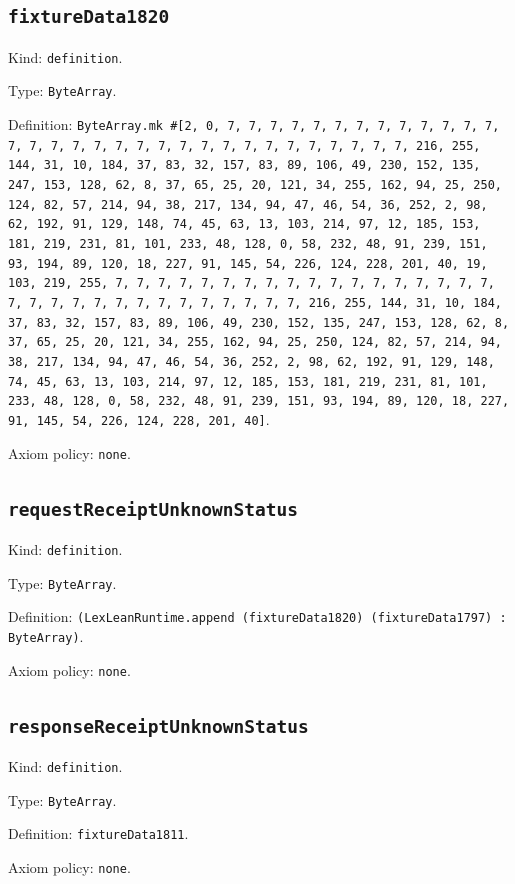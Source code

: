 \documentclass[11pt]{article}
\begin{document}
\subsection*{\texttt{fixtureData1820}}
\noindent Kind: \texttt{definition}.\par
\noindent Type: \texttt{ByteArray}.\par
\noindent Definition: \texttt{ByteArray.mk \#[2, 0, 7, 7, 7, 7, 7, 7, 7, 7, 7, 7, 7, 7, 7, 7, 7, 7, 7, 7, 7, 7, 7, 7, 7, 7, 7, 7, 7, 7, 7, 7, 7, 7, 216, 255, 144, 31, 10, 184, 37, 83, 32, 157, 83, 89, 106, 49, 230, 152, 135, 247, 153, 128, 62, 8, 37, 65, 25, 20, 121, 34, 255, 162, 94, 25, 250, 124, 82, 57, 214, 94, 38, 217, 134, 94, 47, 46, 54, 36, 252, 2, 98, 62, 192, 91, 129, 148, 74, 45, 63, 13, 103, 214, 97, 12, 185, 153, 181, 219, 231, 81, 101, 233, 48, 128, 0, 58, 232, 48, 91, 239, 151, 93, 194, 89, 120, 18, 227, 91, 145, 54, 226, 124, 228, 201, 40, 19, 103, 219, 255, 7, 7, 7, 7, 7, 7, 7, 7, 7, 7, 7, 7, 7, 7, 7, 7, 7, 7, 7, 7, 7, 7, 7, 7, 7, 7, 7, 7, 7, 7, 7, 7, 216, 255, 144, 31, 10, 184, 37, 83, 32, 157, 83, 89, 106, 49, 230, 152, 135, 247, 153, 128, 62, 8, 37, 65, 25, 20, 121, 34, 255, 162, 94, 25, 250, 124, 82, 57, 214, 94, 38, 217, 134, 94, 47, 46, 54, 36, 252, 2, 98, 62, 192, 91, 129, 148, 74, 45, 63, 13, 103, 214, 97, 12, 185, 153, 181, 219, 231, 81, 101, 233, 48, 128, 0, 58, 232, 48, 91, 239, 151, 93, 194, 89, 120, 18, 227, 91, 145, 54, 226, 124, 228, 201, 40]}.\par
\noindent Axiom policy: \texttt{none}.\par
\subsection*{\texttt{requestReceiptUnknownStatus}}
\noindent Kind: \texttt{definition}.\par
\noindent Type: \texttt{ByteArray}.\par
\noindent Definition: \texttt{(LexLeanRuntime.append (fixtureData1820) (fixtureData1797) : ByteArray)}.\par
\noindent Axiom policy: \texttt{none}.\par
\subsection*{\texttt{responseReceiptUnknownStatus}}
\noindent Kind: \texttt{definition}.\par
\noindent Type: \texttt{ByteArray}.\par
\noindent Definition: \texttt{fixtureData1811}.\par
\noindent Axiom policy: \texttt{none}.\par
\end{document}
